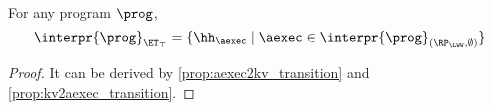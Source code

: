 \begin{corollary}
For any program $\prog$, 
\[
\interpr{\prog}_{\ET_{\top}} = \{\hh_{\aexec} \mid \aexec \in \interpr{\prog}_{(\RP_{\LWW}, \emptyset)}\}
\]
\end{corollary}
\begin{proof}
    It can be derived by \cref{prop:aexec2kv_transition} and \cref{prop:kv2aexec_transition}.
\end{proof}


